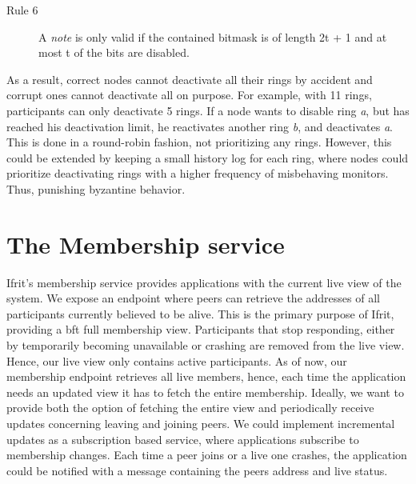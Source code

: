 \documentclass[USenglish]{uit-thesis}
\begin{document}
\begin{description}
	\item[Rule 6] A \textit{note} is only valid if the contained bitmask is of length 2t + 1 and at most t of the bits are disabled.
\end{description}
As a result, correct nodes cannot deactivate all their rings by accident and corrupt ones cannot deactivate all on purpose.
For example, with 11 rings, participants can only deactivate 5 rings.
If a node wants to disable ring \textit{a}, but has reached his deactivation limit, he reactivates another ring \textit{b}, and deactivates \textit{a}.
This is done in a round-robin fashion, not prioritizing any rings.
However, this could be extended by keeping a small history log for each ring, where nodes could prioritize deactivating rings with a higher frequency of misbehaving monitors.  
Thus, punishing byzantine behavior.






\section{The Membership service}
\iffalse
Most distributed system relies on some membership mechanism to discover other participants.
Existing systems often employ partial membership view protocols, where each peer only knows a subset of participants.
Hence, messages has to be routed through the overlay network to reach its destination, increasing the probability of encountering a byzantine or corrupt participant at each hop.
Systems such a Pastry~\cite{pastry} and Chord~\cite{chord} employ partial membership, where peers route messages based on consistent hashing \cite{consthash}.
The main argument of partial membership is the increased scalability compared to maintaining full membership.
However, both Fireflies~\cite{flies} and~\cite{onehop} have shown the feasibility of maintaining full membership.
With full membership, applications can send messages directly to their destination.
\fi
Ifrit's membership service provides applications with the current live view of the system.
We expose an endpoint where peers can retrieve the addresses of all participants currently believed to be alive.
This is the primary purpose of Ifrit, providing a \gls{bft} full membership view.
Participants that stop responding, either by temporarily becoming unavailable or crashing are removed from the live view.
Hence, our live view only contains active participants.
As of now, our membership endpoint retrieves all live members, hence, each time the application needs an updated view it has to fetch the entire membership.
Ideally, we want to provide both the option of fetching the entire view and periodically receive updates concerning leaving and joining peers.
We could implement incremental updates as a subscription based service, where applications subscribe to membership changes.
Each time a peer joins or a live one crashes, the application could be notified with a message containing the peers address and live status.
\end{document}
